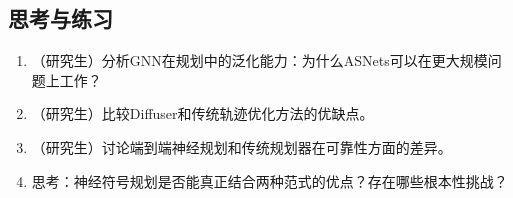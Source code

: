 \subsection*{思考与练习}
\begin{enumerate}
  \item （研究生）分析GNN在规划中的泛化能力：为什么ASNets可以在更大规模问题上工作？
  \item （研究生）比较Diffuser和传统轨迹优化方法的优缺点。
  \item （研究生）讨论端到端神经规划和传统规划器在可靠性方面的差异。
  \item 思考：神经符号规划是否能真正结合两种范式的优点？存在哪些根本性挑战？
\end{enumerate}
